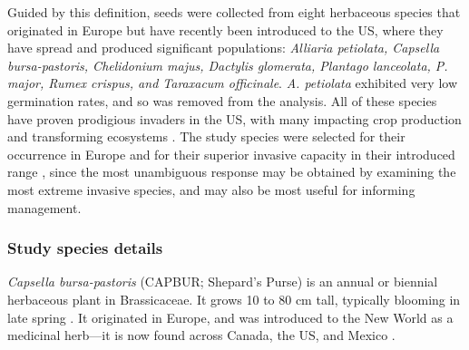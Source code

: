 \documentclass[12pt]{article}\usepackage[]{graphicx}\usepackage[]{color}
\begin{document}
	Guided by this definition, seeds were collected from eight herbaceous species that originated in Europe but have recently been introduced to the US, where they have spread and produced significant populations:\textit{ Alliaria petiolata, Capsella bursa-pastoris, Chelidonium majus, Dactylis glomerata,  Plantago lanceolata, P.  major, Rumex crispus, and Taraxacum officinale}. \textit{A. petiolata} exhibited very low germination rates, and so was removed from the analysis.  All of these species have proven prodigious invaders in the US, with many impacting crop production and transforming ecosystems \parencite[e.g.,][]{Froese2003,Wolfe2008}. The study species were selected for their occurrence in Europe and for their superior invasive capacity in their introduced range \parencite{Uva1997}, since the most unambiguous response may be obtained by examining the most extreme invasive species, and may also be most useful for informing management. 
	\subsubsection{Study species details}
	\textit{Capsella bursa-pastoris} (CAPBUR; Shepard's Purse) is an annual or biennial herbaceous plant in Brassicaceae. It grows 10 to 80 cm tall, typically blooming in late spring \parencite{Defelice2001}. It originated in Europe, and was introduced to the New World as a medicinal herb---it is now found across Canada, the US, and Mexico \parencite{Westrich1989}.
	
\end{document}
